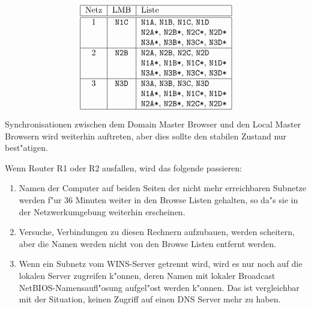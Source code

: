 \documentclass{scrartcl}\usepackage{pslatex}\typearea{12}
\newcommand{\nbname}{\texttt}
\begin{document}
\vspace{\baselineskip}
\[\begin{tabular}{|c|c|l|}
\hline
Netz & LMB &  Liste \\ \hline \hline
1 & \nbname{N1C} & \nbname{N1A}, \nbname{N1B}, \nbname{N1C}, \nbname{N1D}\\
  & & \nbname{N2A*}, \nbname{N2B*}, \nbname{N2C*}, \nbname{N2D*}\\
  & & \nbname{N3A*}, \nbname{N3B*}, \nbname{N3C*}, \nbname{N3D*}\\
\hline
2 & \nbname{N2B} & \nbname{N2A}, \nbname{N2B}, \nbname{N2C}, \nbname{N2D}\\
  & & \nbname{N1A*}, \nbname{N1B*}, \nbname{N1C*}, \nbname{N1D*}\\
  & & \nbname{N3A*}, \nbname{N3B*}, \nbname{N3C*}, \nbname{N3D*}\\
\hline
3 & \nbname{N3D} & \nbname{N3A}, \nbname{N3B}, \nbname{N3C}, \nbname{N3D}\\
  & & \nbname{N1A*}, \nbname{N1B*}, \nbname{N1C*}, \nbname{N1D*}\\
  & & \nbname{N2A*}, \nbname{N2B*}, \nbname{N2C*}, \nbname{N2D*}\\
\hline
\end{tabular}\]
\vspace{\baselineskip}

Synchronisationen zwischen dem Domain Master Browser und den Local
Master Browsern wird weiterhin auftreten, aber dies sollte den
stabilen Zustand nur best"atigen.

Wenn Router R1 oder R2 ausfallen, wird das folgende passieren:

\begin{enumerate}
\item Namen der Computer auf beiden Seiten der nicht mehr erreichbaren
Subnetze werden f"ur 36 Minuten weiter in den Browse Listen gehalten,
so da"s sie in der Netzwerkumgebung weiterhin erscheinen.

\item Versuche, Verbindungen zu diesen Rechnern aufzubauen, werden
scheitern, aber die Namen werden nicht von den Browse Listen entfernt
werden.

\item Wenn ein Subnetz vom WINS-Server getrennt wird, wird es nur noch
auf die lokalen Server zugreifen k"onnen, deren Namen mit lokaler
Broadcast NetBIOS-Namensaufl"osung aufgel"ost werden k"onnen. Das ist
vergleichbar mit der Situation, keinen Zugriff auf einen DNS Server
mehr zu haben.
\end{enumerate}
\end{document}
